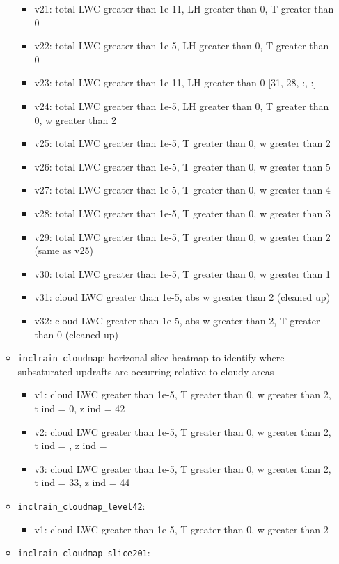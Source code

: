 \documentclass{article}
\begin{document}
\begin{itemize}
\begin{itemize}
\begin{itemize}
			\item v21: total LWC greater than 1e-11, LH greater than 0, T greater than 0
			\item v22: total LWC greater than 1e-5, LH greater than 0, T greater than 0
			\item v23: total LWC greater than 1e-11, LH greater than 0 [31, 28, :, :]
			\item v24: total LWC greater than 1e-5, LH greater than 0, T greater than 0, w greater than 2
			\item v25: total LWC greater than 1e-5, T greater than 0, w greater than 2
			\item v26: total LWC greater than 1e-5, T greater than 0, w greater than 5
			\item v27: total LWC greater than 1e-5, T greater than 0, w greater than 4
			\item v28: total LWC greater than 1e-5, T greater than 0, w greater than 3
			\item v29: total LWC greater than 1e-5, T greater than 0, w greater than 2 (same as v25)
			\item v30: total LWC greater than 1e-5, T greater than 0, w greater than 1
			\item v31: cloud LWC greater than 1e-5, abs w greater than 2 (cleaned up)
			\item v32: cloud LWC greater than 1e-5, abs w greater than 2, T greater than 0 (cleaned up)
		\end{itemize}
		\item \texttt{inclrain\_cloudmap}: horizonal slice heatmap to identify where subsaturated updrafts are occurring relative to cloudy areas
		\begin{itemize}
			\item v1: cloud LWC greater than 1e-5, T greater than 0, w greater than 2, t ind = 0, z ind = 42
			\item v2: cloud LWC greater than 1e-5, T greater than 0, w greater than 2, t ind = , z ind = 
			\item v3: cloud LWC greater than 1e-5, T greater than 0, w greater than 2, t ind = 33, z ind = 44
		\end{itemize}
		\item \texttt{inclrain\_cloudmap\_level42}:
		\begin{itemize}
			\item v1: cloud LWC greater than 1e-5, T greater than 0, w greater than 2
		\end{itemize}
		\item \texttt{inclrain\_cloudmap\_slice201}:

\end{itemize}
\end{itemize}
\end{document}
